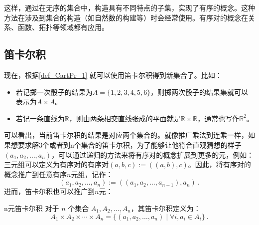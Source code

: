 这样，通过在无序的集合中，构造具有不同特点的子集，实现了有序的概念。这种方法在涉及到集合的构造（如自然数的构建等）时会经常使用。有序对的概念在关系、函数、拓扑等领域都有应用。

\subsection{笛卡尔积}

现在，根据\autoref{def_CartPr_1} 就可以使用笛卡尔积得到新集合了。比如：
\begin{itemize}
\item 若记掷一次骰子的结果为$A=\{1, 2, 3, 4, 5, 6\}$，则掷两次骰子的结果集就可以表示为$A\times A$。
\item 若记一条直线为${\mathbb R}$，则由两条相交直线张成的平面就是${\mathbb R}\times{\mathbb R}$，通常也写作${\mathbb R}^2$。
\end{itemize}
可以看出，当前笛卡尔积的结果是对应两个集合的。就像推广乘法到连乘一样，如果想要求解3个或者到n个集合的笛卡尔积，为了能够让他符合直观猜想的样子$(a_1, a_2, \ldots, a_n)$，可以通过递归的方法来将有序对的概念扩展到更多的元，例如：三元组可以定义为有序对的有序对$(a, b, c) := ((a, b), c)$。因此，将有序对的概念推广到任意有序$n$元组，记作：
\begin{equation}
(a_1, a_2, \ldots, a_n) := ((a_1, a_2, \ldots, a_{n-1}), a_n)~.
\end{equation}
进而，笛卡尔积也可以推广到$n$元：
\begin{definition}{n元笛卡尔积}
对于 $n$ 个集合 $A_1, A_2, \ldots, A_n$，其笛卡尔积定义为：
\begin{equation}
A_1 \times A_2 \times \cdots \times A_n = \{(a_1, a_2, \ldots, a_n) \mid \forall i,a_i \in A_i \} ~.
\end{equation}
\end{definition}